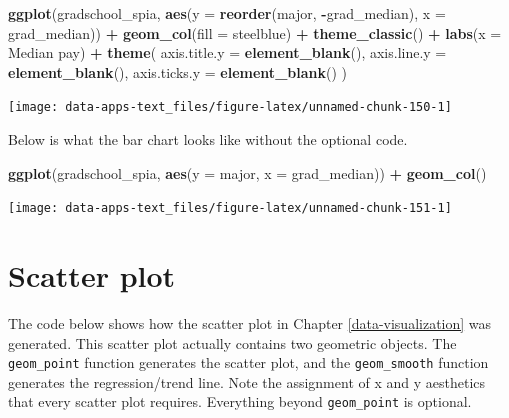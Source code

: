 \documentclass[
]{book}
\makeatletter
\newenvironment{Shaded}{\begin{snugshade}}{\end{snugshade}}
\newcommand{\AttributeTok}[1]{\textcolor[rgb]{0.27,0.27,0.27}{#1}}
\newcommand{\FunctionTok}[1]{\textcolor[rgb]{0.27,0.27,0.27}{\textbf{#1}}}
\newcommand{\NormalTok}[1]{#1}
\newcommand{\SpecialCharTok}[1]{\textcolor[rgb]{0.43,0.43,0.43}{\textbf{#1}}}
\newcommand{\StringTok}[1]{\textcolor[rgb]{0.5,0.5,0.5}{#1}}
\newenvironment{kframe}{%
\medskip{}
\setlength{\fboxsep}{.8em}
 \def\at@end@of@kframe{}%
 \ifinner\ifhmode%
  \def\at@end@of@kframe{\end{minipage}}%
  \begin{minipage}{\columnwidth}%
 \fi\fi%
 \def\FrameCommand##1{\hskip\@totalleftmargin \hskip-\fboxsep
 \colorbox{shadecolor}{##1}\hskip-\fboxsep
     \hskip-\linewidth \hskip-\@totalleftmargin \hskip\columnwidth}%
 \MakeFramed {\advance\hsize-\width
   \@totalleftmargin\z@ \linewidth\hsize
   \@setminipage}}%
 {\par\unskip\endMakeFramed%
 \at@end@of@kframe}
\renewenvironment{Shaded}{\begin{kframe}}{\end{kframe}}
\makeatother
\begin{document}
\begin{Shaded}
\begin{Highlighting}[]
\FunctionTok{ggplot}\NormalTok{(gradschool\_spia, }\FunctionTok{aes}\NormalTok{(}\AttributeTok{y =} \FunctionTok{reorder}\NormalTok{(major, }\SpecialCharTok{{-}}\NormalTok{grad\_median), }\AttributeTok{x =}\NormalTok{ grad\_median)) }\SpecialCharTok{+}
  \FunctionTok{geom\_col}\NormalTok{(}\AttributeTok{fill =} \StringTok{\textquotesingle{}steelblue\textquotesingle{}}\NormalTok{) }\SpecialCharTok{+}
  \FunctionTok{theme\_classic}\NormalTok{() }\SpecialCharTok{+}
  \FunctionTok{labs}\NormalTok{(}\AttributeTok{x =} \StringTok{\textquotesingle{}Median pay\textquotesingle{}}\NormalTok{) }\SpecialCharTok{+}
  \FunctionTok{theme}\NormalTok{(}
    \AttributeTok{axis.title.y =} \FunctionTok{element\_blank}\NormalTok{(),}
    \AttributeTok{axis.line.y =} \FunctionTok{element\_blank}\NormalTok{(),}
    \AttributeTok{axis.ticks.y =} \FunctionTok{element\_blank}\NormalTok{()}
\NormalTok{  )}
\end{Highlighting}
\end{Shaded}

\begin{center}\texttt{[image: data-apps-text\_files/figure-latex/unnamed-chunk-150-1]} \end{center}

Below is what the bar chart looks like without the optional code.

\begin{Shaded}
\begin{Highlighting}[]
\FunctionTok{ggplot}\NormalTok{(gradschool\_spia, }\FunctionTok{aes}\NormalTok{(}\AttributeTok{y =}\NormalTok{ major, }\AttributeTok{x =}\NormalTok{ grad\_median)) }\SpecialCharTok{+}
  \FunctionTok{geom\_col}\NormalTok{()}
\end{Highlighting}
\end{Shaded}

\begin{center}\texttt{[image: data-apps-text\_files/figure-latex/unnamed-chunk-151-1]} \end{center}

\hypertarget{scatter-plot-1}{%
\section{Scatter plot}\label{scatter-plot-1}}

The code below shows how the scatter plot in Chapter \ref{data-visualization} was generated. This scatter plot actually contains two geometric objects. The \texttt{geom\_point} function generates the scatter plot, and the \texttt{geom\_smooth} function generates the regression/trend line. Note the assignment of x and y aesthetics that every scatter plot requires. Everything beyond \texttt{geom\_point} is optional.
\end{document}
